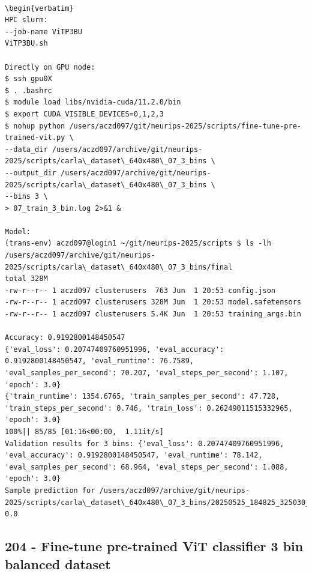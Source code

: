 \begin{verbatim}

\begin{verbatim}
HPC slurm:
--job-name ViTP3BU
ViTP3BU.sh

Directly on GPU node:
$ ssh gpu0X
$ . .bashrc
$ module load libs/nvidia-cuda/11.2.0/bin
$ export CUDA_VISIBLE_DEVICES=0,1,2,3
$ nohup python /users/aczd097/git/neurips-2025/scripts/fine-tune-pre-trained-vit.py \
--data_dir /users/aczd097/archive/git/neurips-2025/scripts/carla\_dataset\_640x480\_07_3_bins \
--output_dir /users/aczd097/archive/git/neurips-2025/scripts/carla\_dataset\_640x480\_07_3_bins \
--bins 3 \
> 07_train_3_bin.log 2>&1 &

Model:
(trans-env) aczd097@login1 ~/git/neurips-2025/scripts $ ls -lh /users/aczd097/archive/git/neurips-2025/scripts/carla\_dataset\_640x480\_07_3_bins/final
total 328M
-rw-r--r-- 1 aczd097 clusterusers  763 Jun  1 20:53 config.json
-rw-r--r-- 1 aczd097 clusterusers 328M Jun  1 20:53 model.safetensors
-rw-r--r-- 1 aczd097 clusterusers 5.4K Jun  1 20:53 training_args.bin

Accuracy: 0.9192800148450547
{'eval_loss': 0.20747409760951996, 'eval_accuracy': 0.9192800148450547, 'eval_runtime': 76.7589, 'eval_samples_per_second': 70.207, 'eval_steps_per_second': 1.107, 'epoch': 3.0}
{'train_runtime': 1354.6765, 'train_samples_per_second': 47.728, 'train_steps_per_second': 0.746, 'train_loss': 0.26249011515332965, 'epoch': 3.0}
100%|| 85/85 [01:16<00:00,  1.11it/s]
Validation results for 3 bins: {'eval_loss': 0.20747409760951996, 'eval_accuracy': 0.9192800148450547, 'eval_runtime': 78.142, 'eval_samples_per_second': 68.964, 'eval_steps_per_second': 1.088, 'epoch': 3.0}
Sample prediction for /users/aczd097/archive/git/neurips-2025/scripts/carla\_dataset\_640x480\_07_3_bins/20250525_184825_325030_steering_0.0000.jpg: 0.0

\end{verbatim}


\subsection{204 - Fine-tune pre-trained ViT classifier 3 bin balanced dataset}
\label{app_res:204}

